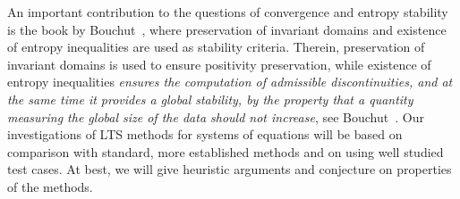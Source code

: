 An important contribution to the questions of convergence and entropy stability is the book by Bouchut~\cite{bou04}, where preservation of invariant domains and existence of entropy inequalities are used as stability criteria. Therein, preservation of invariant domains is used to ensure positivity preservation, while existence of entropy inequalities \textit{ensures the computation of admissible discontinuities, and at the same time it provides a global stability, by the property that a quantity measuring the global size of the data should not increase}, see Bouchut~\cite{bou04}. Our investigations of LTS methods for systems of equations will be based on comparison with standard, more established methods and on using well studied test cases. At best, we will give heuristic arguments and conjecture on properties of the methods.
